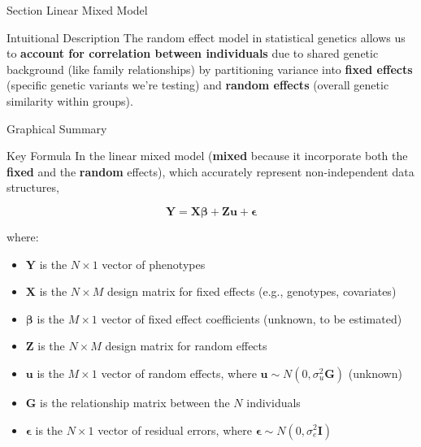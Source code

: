 
\begin{frame}{Section}
\centering
\Huge{Linear Mixed Model}
\end{frame}


\begin{frame}{Intuitional Description}
The random effect model in statistical genetics allows us to \textbf{account for correlation between individuals} due to shared genetic background (like family relationships) by partitioning variance into \textbf{fixed effects} (specific genetic variants we're testing) and \textbf{random effects} (overall genetic similarity within groups). 
\end{frame}

\begin{frame}{Graphical Summary}

\end{frame}


\begin{frame}{Key Formula}
In the linear mixed model (\textbf{mixed} because it incorporate both the \textbf{fixed} and the \textbf{random} effects), which accurately represent non-independent data structures,

$$
\mathbf{Y} = \mathbf{X}\boldsymbol{\beta} + \mathbf{Z}\mathbf{u} + \boldsymbol{\epsilon}
$$

where:
\begin{itemize}
\item $\mathbf{Y}$ is the $N \times 1$ vector of phenotypes
\item $\mathbf{X}$ is the $N \times M$ design matrix for fixed effects (e.g., genotypes, covariates)
\item $\boldsymbol{\beta}$ is the $M \times 1$ vector of fixed effect coefficients (unknown, to be estimated)
\item $\mathbf{Z}$ is the $N \times M$ design matrix for random effects
\item $\mathbf{u}$ is the $M \times 1$ vector of random effects, where $\mathbf{u} \sim N(0, \sigma^2_u\mathbf{G})$ (unknown)
\item $\mathbf{G}$ is the relationship matrix between the $N$ individuals
\item $\boldsymbol{\epsilon}$ is the $N \times 1$ vector of residual errors, where $\boldsymbol{\epsilon} \sim N(0, \sigma^2_e\mathbf{I})$
\end{itemize}
\end{frame}


